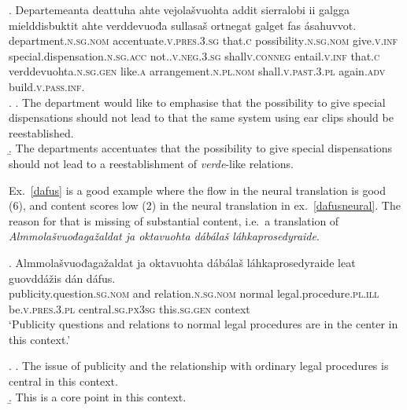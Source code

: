 \documentclass{flammie}
\begin{document}
\exg. Departemeanta deattuha ahte vejolašvuohta addit sierralobi ii galgga
mielddisbuktit ahte verddevuođa sullasaš ortnegat galget fas
ásahuvvot.\label{MLevalex}\\
department\textsc{.n.sg.nom} accentuate\textsc{.v.pres.3.sg} that\textsc{.c}
possibility\textsc{.n.sg.nom} give\textsc{.v.inf}
special.dispensation\textsc{.n.sg.acc} not.\textsc{.v.neg.3.sg}
shall\textsc{v.conneg} entail\textsc{.v.inf} that\textsc{.c}
verddevuohta\textsc{.n.sg.gen} like\textsc{.a} arrangement\textsc{.n.pl.nom}
shall\textsc{.v.past.3.pl} again\textsc{.adv} build\textsc{.v.pass.inf}.\\


\ex.
\a. The department would like to emphasise that the possibility to give special
dispensations should not lead to that the same system using ear clips should be
reestablished.\label{MLevalexhuman}\\
\b. The departments accentuates that the possibility to give special
dispensations should not lead to a reestablishment of \textit{verde}-like
relations.\label{MLevalexneural}


Ex.~\ref{dafus} is a good example where the flow in the neural translation is
good (6), and content scores low (2) in the neural translation in
ex.~\ref{dafusneural}.  The reason for that is missing of substantial content,
i.e.\ a translation of \textit{Almmolašvuođagažaldat ja oktavuohta dábálaš
láhkaprosedyraide}.

\exg. Almmolašvuođagažaldat ja oktavuohta dábálaš láhkaprosedyraide leat
guovddážis dán dáfus.\label{dafus}\\
publicity.question\textsc{.sg.nom} and relation\textsc{.n.sg.nom} normal
legal.procedure\textsc{.pl.ill} be\textsc{.v.pres.3.pl}
central\textsc{.sg.px3sg} this\textsc{.sg.gen} context\\
`Publicity questions and relations to normal legal procedures are in the center in this context.'

\ex.
\a. The issue of publicity and the relationship with ordinary legal procedures
is central in this context.\label{dafushuman}\\
\b. This is a core point in this context.\label{dafusneural}
\end{document}
